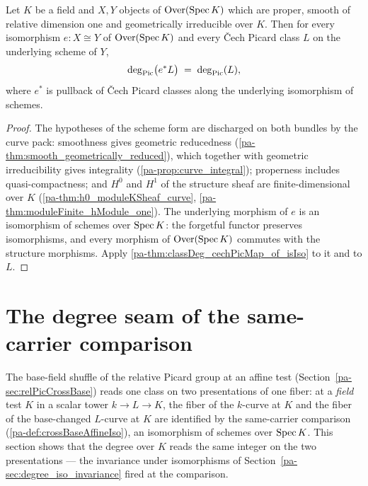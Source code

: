 \begin{theorem}
  \label{pa-thm:classDeg_map_iso}
  \leanok

  Let \(K\) be a field and \(X, Y\) objects of \(\mathrm{Over}(\operatorname{Spec} K)\) which are proper,
  smooth of relative dimension one and geometrically irreducible over \(K\). Then for
  every isomorphism \(e : X \cong Y\) of \(\mathrm{Over}(\operatorname{Spec} K)\) and every \v Cech Picard
  class \(L\) on the underlying scheme of \(Y\),
  \[
    \deg_{\operatorname{Pic}}\bigl(e^{*}L\bigr) \;=\; \deg_{\operatorname{Pic}}(L),
  \]
  where \(e^{*}\) is pullback of \v Cech Picard classes along the underlying
  isomorphism of schemes.
\end{theorem}
\begin{proof}
  \leanok
  The hypotheses of the scheme form are discharged on both bundles by the curve pack:
  smoothness gives geometric reducedness (\ref{pa-thm:smooth_geometrically_reduced}),
  which together with geometric irreducibility gives integrality
  (\ref{pa-prop:curve_integral}); properness includes quasi-compactness; and \(H^0\) and
  \(H^1\) of the structure sheaf are finite-dimensional over \(K\)
  (\ref{pa-thm:h0_moduleKSheaf_curve}, \ref{pa-thm:moduleFinite_hModule_one}). The
  underlying morphism of \(e\) is an isomorphism of schemes over \(\operatorname{Spec} K\): the
  forgetful functor preserves isomorphisms, and every morphism of \(\mathrm{Over}(\operatorname{Spec} K)\)
  commutes with the structure morphisms. Apply
  \ref{pa-thm:classDeg_cechPicMap_of_isIso} to it and to \(L\).
\end{proof}

\section{The degree seam of the same-carrier comparison}
\label{pa-sec:degree_crossBase_seam}

The base-field shuffle of the relative Picard group at an affine test
(Section~\ref{pa-sec:relPicCrossBase}) reads one class on two presentations of one fiber:
at a \emph{field} test \(K\) in a scalar tower \(k \to L \to K\), the fiber of the
\(k\)-curve at \(K\) and the fiber of the base-changed \(L\)-curve at \(K\) are
identified by the same-carrier comparison (\ref{pa-def:crossBaseAffineIso}), an
isomorphism of schemes over \(\operatorname{Spec} K\). This section shows that the degree over
\(K\) reads the same integer on the two presentations --- the invariance under
isomorphisms of Section~\ref{pa-sec:degree_iso_invariance} fired at the comparison.

